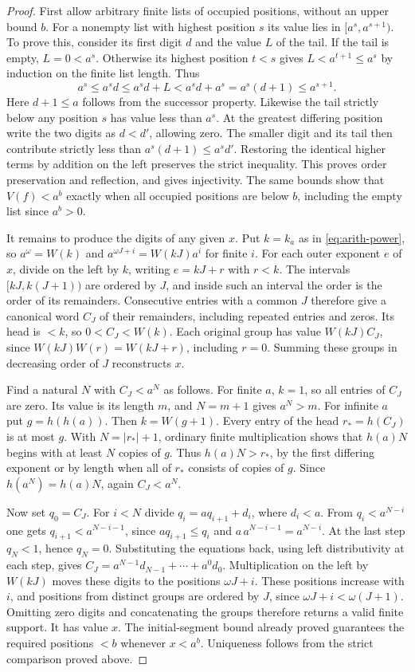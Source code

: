 \begin{proof}
First allow arbitrary finite lists of occupied positions, without an
upper bound $b$. For a nonempty list with highest position $s$ its
value lies in $[a^s,a^{s+1})$. To prove this, consider its first
digit $d$ and the value $L$ of the tail. If the tail is empty,
$L=0<a^s$. Otherwise its highest position $t<s$ gives
$L<a^{t+1}\le a^s$ by induction on the finite list length. Thus
\[
 a^s\le a^s d\le a^s d+L<a^s d+a^s=a^s(d+1)\le a^{s+1}.
\]
Here $d+1\le a$ follows from the successor property. Likewise the
tail strictly below any position $s$ has value less than $a^s$.
At the greatest differing position write the two digits as $d<d'$,
allowing zero. The smaller digit and its tail then contribute strictly
less than $a^s(d+1)\le a^s d'$. Restoring the identical higher terms
by addition on the left preserves the strict inequality. This proves
order preservation and reflection, and gives injectivity. The same
bounds show that $V(f)<a^b$ exactly when all occupied positions are
below $b$, including the empty list since $a^b>0$.

It remains to produce the digits of any given $x$. Put $k=k_a$ as in
\eqref{eq:arith-power}, so $a^\omega=W(k)$ and
$a^{\omega J+i}=W(kJ)a^i$ for finite $i$. For each outer exponent $e$
of $x$, divide on the left by $k$, writing $e=kJ+r$ with $r<k$.
The intervals $[kJ,k(J+1))$ are ordered by $J$, and inside such an
interval the order is the order of its remainders. Consecutive entries
with a common $J$ therefore give a canonical word $C_J$ of their
remainders, including repeated entries and zeros. Its head is $<k$, so
$0<C_J<W(k)$. Each original group has value $W(kJ)C_J$, since
$W(kJ)W(r)=W(kJ+r)$, including $r=0$. Summing these groups in
decreasing order of $J$ reconstructs $x$.

Find a natural $N$ with $C_J<a^N$ as follows. For finite $a$, $k=1$,
so all entries of $C_J$ are zero. Its value is its length $m$,
and $N=m+1$ gives $a^N>m$. For infinite $a$ put $g=h(h(a))$.
Then $k=W(g+1)$. Every entry of the head $r_*=h(C_J)$ is at most
$g$. With $N=|r_*|+1$, ordinary finite multiplication shows that
$h(a)N$ begins with at least $N$ copies of $g$. Thus
$h(a)N>r_*$, by the first differing exponent or by length when all
of $r_*$ consists of copies of $g$. Since $h(a^N)=h(a)N$,
again $C_J<a^N$.

Now set $q_0=C_J$. For $i<N$ divide $q_i=aq_{i+1}+d_i$,
where $d_i<a$. From $q_i<a^{N-i}$ one gets
$q_{i+1}<a^{N-i-1}$, since $aq_{i+1}\le q_i$ and
$a\,a^{N-i-1}=a^{N-i}$. At the last step $q_N<1$, hence $q_N=0$.
Substituting the equations back, using left distributivity at each
step, gives $C_J=a^{N-1}d_{N-1}+\cdots+a^0d_0$.
Multiplication on the left by $W(kJ)$ moves these digits to the positions
$\omega J+i$. These positions increase with $i$, and positions from
distinct groups are ordered by $J$, since
$\omega J+i<\omega(J+1)$. Omitting zero digits and concatenating the
groups therefore returns a valid finite support. It has value $x$.
The initial-segment bound already proved guarantees the required
positions $<b$ whenever $x<a^b$. Uniqueness follows from the strict
comparison proved above.


\end{proof}
